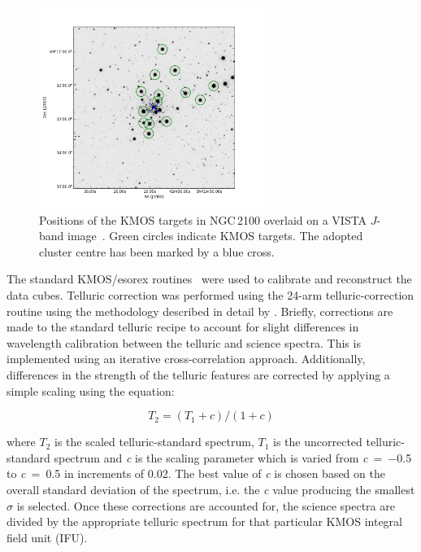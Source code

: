 \begin{figure}
\centering
 \includegraphics[width=0.65\textwidth]{ngc2100/NGC2100-targets}
 \caption[NGC\,2100 Targets]{Positions of the KMOS targets in NGC\,2100 overlaid on a VISTA $J$-band image~\citep{2011A&A...527A.116C}.
          Green circles indicate KMOS targets.
          The adopted cluster centre has been marked by a blue cross.\label{fig:targets}
          }
\end{figure}

The standard KMOS/esorex routines~\citep[SPARK;][]{2013A&A...558A..56D} were used to calibrate and reconstruct the data cubes.
Telluric correction was performed using the 24-arm telluric-correction routine using the methodology described in detail by
\citet{2015ApJ...803...14P}.
Briefly, corrections are made to the standard telluric recipe to account for slight differences in wavelength calibration between the telluric and science spectra.
This is implemented using an iterative cross-correlation approach.
Additionally, differences in the strength of the telluric features are corrected by applying a simple scaling using the equation:

\begin{equation}
  T_{2} = (T_{1} + c) / (1 + c)
\end{equation}

\noindent where $T_{2}$ is the scaled telluric-standard spectrum, $T_{1}$ is the uncorrected telluric-standard spectrum and {\it c} is the scaling parameter which is varied from {\it c}~=~$-$0.5 to {\it c}~=~0.5 in increments of 0.02.
The best value of {\it c} is chosen based on the overall standard deviation of the spectrum, i.e. the {\it c} value producing the smallest $\sigma$ is selected.
Once these corrections are accounted for, the science spectra are divided by the appropriate telluric spectrum for that particular KMOS integral field unit (IFU).


